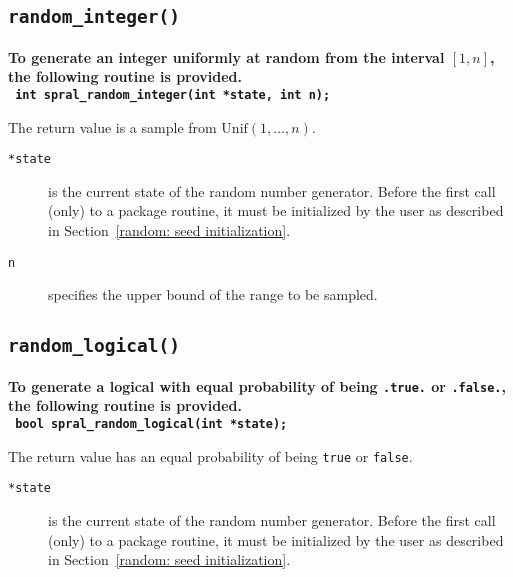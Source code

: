 \subsection{\texttt{random\_integer()}}

\textbf{\noindent
   To generate an integer uniformly at random from the interval $[1,n]$, the
   following routine is provided.
   \vspace*{0.1cm} \\
   \texttt{ \hspace*{0.2cm}
      int spral\_random\_integer(int *state, int n);
   }
   \vspace{0.3cm}
}

\noindent
The return value is a sample from $\mathrm{Unif}(1, \ldots, n)$.

\begin{description}

\item[\texttt{*state}] is the current state of the random number generator.
   Before the first call (only) to a package routine, it must be initialized by
   the user as described in Section~\ref{random: seed initialization}.

\item[\texttt{n}] specifies the upper bound of the range to be sampled.

\end{description}

\subsection{\texttt{random\_logical()}}

\textbf{\noindent
   To generate a logical with equal probability of being \texttt{.true.} or \texttt{.false.}, the following routine is provided.
   \vspace*{0.1cm} \\
   \texttt{ \hspace*{0.2cm}
      bool spral\_random\_logical(int *state);
   }
   \vspace{0.3cm}
}

\noindent
The return value has an equal probability of being {\tt true} or {\tt false}.

\begin{description}

\item[\texttt{*state}] is the current state of the random number generator.
   Before the first call (only) to a package routine, it must be initialized by
   the user as described in Section~\ref{random: seed initialization}.

\end{description}

